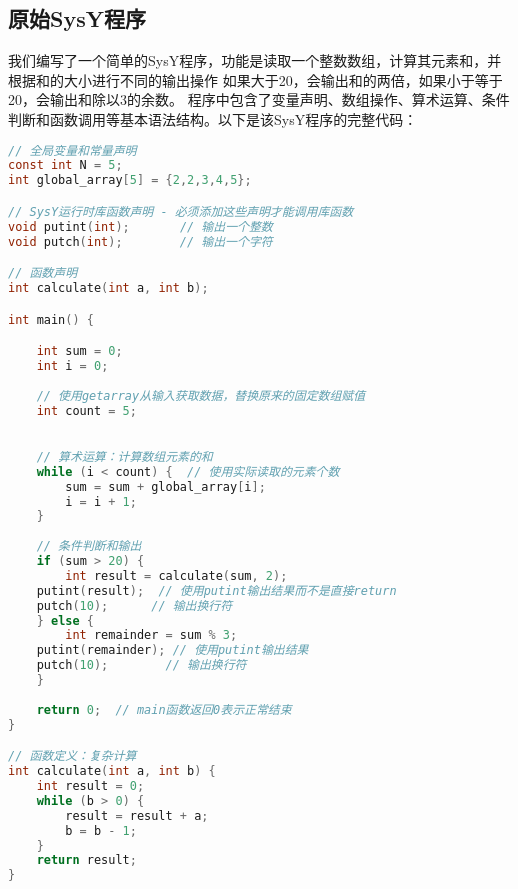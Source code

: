 \documentclass[a4paper]{article}
\begin{document}
\subsection{原始SysY程序}
我们编写了一个简单的SysY程序，功能是读取一个整数数组，计算其元素和，并根据和的大小进行不同的输出操作
如果大于20，会输出和的两倍，如果小于等于20，会输出和除以3的余数。
程序中包含了变量声明、数组操作、算术运算、条件判断和函数调用等基本语法结构。以下是该SysY程序的完整代码：
\begin{lstlisting}[title=逐列访问平凡算法,frame=trbl,language={C}]
// 全局变量和常量声明
const int N = 5;
int global_array[5] = {2,2,3,4,5};

// SysY运行时库函数声明 - 必须添加这些声明才能调用库函数
void putint(int);       // 输出一个整数
void putch(int);        // 输出一个字符

// 函数声明
int calculate(int a, int b);

int main() {

    int sum = 0;
    int i = 0;
    
    // 使用getarray从输入获取数据，替换原来的固定数组赋值
    int count = 5;

    
    // 算术运算：计算数组元素的和
    while (i < count) {  // 使用实际读取的元素个数
        sum = sum + global_array[i];
        i = i + 1;
    }
    
    // 条件判断和输出
    if (sum > 20) {
        int result = calculate(sum, 2);
    putint(result);  // 使用putint输出结果而不是直接return
    putch(10);      // 输出换行符
    } else {
        int remainder = sum % 3;
    putint(remainder); // 使用putint输出结果
    putch(10);        // 输出换行符
    }
    
    return 0;  // main函数返回0表示正常结束
}

// 函数定义：复杂计算
int calculate(int a, int b) {
    int result = 0;
    while (b > 0) {
        result = result + a;
        b = b - 1;
    }
    return result;
}\end{lstlisting}
\end{document}
